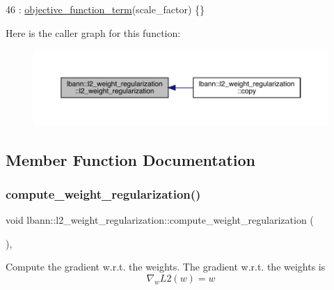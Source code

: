 \begin{DoxyCode}
46     : \hyperlink{classlbann_1_1objective__function__term_a8c019e3c880f38dc20275e395acaeca1}{objective\_function\_term}(scale\_factor) \{\}
\end{DoxyCode}
Here is the caller graph for this function\+:\nopagebreak
\begin{figure}[H]
\begin{center}
\leavevmode
\includegraphics[width=350pt]{classlbann_1_1l2__weight__regularization_aa2a01507574b4d349ae8bb9bb784ecaf_icgraph}
\end{center}
\end{figure}


\subsection{Member Function Documentation}
\mbox{\label{classlbann_1_1l2__weight__regularization_a1dce8a486660335097f5ad239b343e39}} 
\subsubsection{\texorpdfstring{compute\+\_\+weight\+\_\+regularization()}{compute\_weight\_regularization()}}
{\footnotesize\ttfamily void lbann\+::l2\+\_\+weight\+\_\+regularization\+::compute\+\_\+weight\+\_\+regularization (\begin{DoxyParamCaption}{ }\end{DoxyParamCaption})\hspace{0.3cm}{\ttfamily [override]}, {\ttfamily [virtual]}}

Compute the gradient w.\+r.\+t. the weights. The gradient w.\+r.\+t. the weights is \[ \nabla_w L2(w) = w \] 

